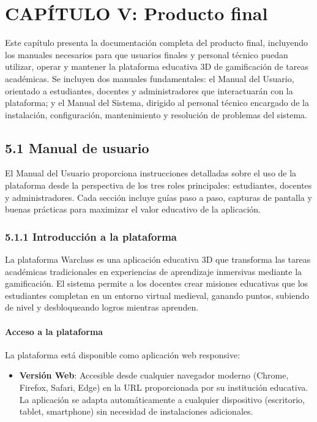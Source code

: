 \section{CAPÍTULO V: Producto final}

Este capítulo presenta la documentación completa del producto final, incluyendo los manuales necesarios para que usuarios finales y personal técnico puedan utilizar, operar y mantener la plataforma educativa 3D de gamificación de tareas académicas. Se incluyen dos manuales fundamentales: el Manual del Usuario, orientado a estudiantes, docentes y administradores que interactuarán con la plataforma; y el Manual del Sistema, dirigido al personal técnico encargado de la instalación, configuración, mantenimiento y resolución de problemas del sistema.

\subsection{5.1 Manual de usuario}

El Manual del Usuario proporciona instrucciones detalladas sobre el uso de la plataforma desde la perspectiva de los tres roles principales: estudiantes, docentes y administradores. Cada sección incluye guías paso a paso, capturas de pantalla y buenas prácticas para maximizar el valor educativo de la aplicación.

\subsubsection{5.1.1 Introducción a la plataforma}

La plataforma Warclass es una aplicación educativa 3D que transforma las tareas académicas tradicionales en experiencias de aprendizaje inmersivas mediante la gamificación. El sistema permite a los docentes crear misiones educativas que los estudiantes completan en un entorno virtual medieval, ganando puntos, subiendo de nivel y desbloqueando logros mientras aprenden.

\paragraph{Acceso a la plataforma}

La plataforma está disponible como aplicación web responsive:

\begin{itemize}
	\item \textbf{Versión Web}: Accesible desde cualquier navegador moderno (Chrome, Firefox, Safari, Edge) en la URL proporcionada por su institución educativa. La aplicación se adapta automáticamente a cualquier dispositivo (escritorio, tablet, smartphone) sin necesidad de instalaciones adicionales.
\end{itemize}

